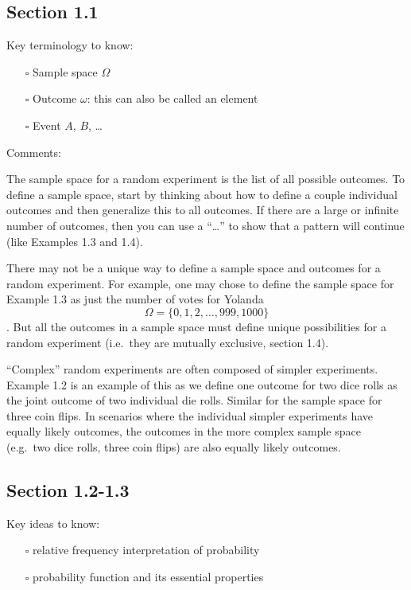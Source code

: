 \documentclass[
  letterpaper,
]{scrbook}
\providecommand{\tightlist}{%
  \setlength{\itemsep}{0pt}\setlength{\parskip}{0pt}}\usepackage{longtable,booktabs,array}
\begin{document}
\subsection*{Section 1.1}\label{section-1.1}

Key terminology to know:

\begin{itemize}
\tightlist
\item[$\square$]
  Sample space \(\Omega\)
\item[$\square$]
  Outcome \(\omega\): this can also be called an element
\item[$\square$]
  Event \(A\), \(B\), \ldots{}
\end{itemize}

Comments:

The sample space for a random experiment is the list of all possible
outcomes. To define a sample space, start by thinking about how to
define a couple individual outcomes and then generalize this to all
outcomes. If there are a large or infinite number of outcomes, then you
can use a ``\ldots{}'' to show that a pattern will continue (like
Examples 1.3 and 1.4).

There may not be a unique way to define a sample space and outcomes for
a random experiment. For example, one may chose to define the sample
space for Example 1.3 as just the number of votes for Yolanda
\[\Omega = \{ 0, 1, 2, \dotsc, 999, 1000\}\]. But all the outcomes in a
sample space must define unique possibilities for a random experiment
(i.e.~they are mutually exclusive, section 1.4).

``Complex'' random experiments are often composed of simpler
experiments. Example 1.2 is an example of this as we define one outcome
for two dice rolls as the joint outcome of two individual die rolls.
Similar for the sample space for three coin flips. In scenarios where
the individual simpler experiments have equally likely outcomes, the
outcomes in the more complex sample space (e.g.~two dice rolls, three
coin flips) are also equally likely outcomes.

\subsection*{Section 1.2-1.3}\label{section-1.2-1.3}

Key ideas to know:

\begin{itemize}
\tightlist
\item[$\square$]
  relative frequency interpretation of probability
\item[$\square$]
  probability function and its essential properties
\end{itemize}
\end{document}
